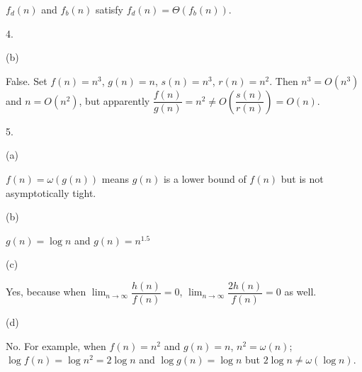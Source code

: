 \documentclass[UTF8,12pt,letterpaper,oneside]{amsart}
\begin{document}
$f_d (n)$ and $f_b (n)$ satisfy $f_d (n) = \Theta (f_b(n))$.

4.

(b)

False. Set $f(n) = n^3$, $g(n) = n$, $s(n) = n^3$, $r(n) = n^2$. Then $n^3 = O (n^3)$ and $n = O(n^2)$, but apparently $\dfrac{f(n)}{g(n)} = n^2 \neq O\left(\dfrac{s(n)}{r(n)}\right) = O(n)$.

5.

(a)

$f(n) = \omega(g(n))$ means $g(n)$ is a lower bound of $f(n)$ but is not asymptotically tight.

(b)

$g(n) = \log n$ and $g(n) = n^{1.5}$

(c)

Yes, because when $\lim_{n \to \infty} \dfrac{h(n)}{f(n)} = 0$, $\lim_{n \to \infty} \dfrac{2h(n)}{f(n)} = 0$ as well.

(d)

No. For example, when $f(n) = n^2$ and $g(n) = n$, $n^2 = \omega(n)$; $\log f(n) = \log n^2 = 2 \log n$ and $\log g(n) = \log n$ but $2 \log n \neq \omega(\log n)$.
\end{document}
